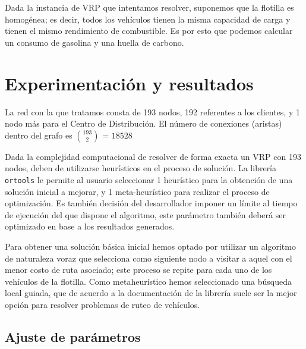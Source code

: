 \documentclass[journal]{IEEEtran}
\begin{document}
            Dada la instancia de VRP que intentamos resolver, suponemos que la flotilla es homogénea; es decir, todos los vehículos tienen la misma capacidad de carga y tienen el mismo rendimiento de combustible. Es por esto que podemos calcular un consumo de gasolina y una huella de carbono.
            
    \section{Experimentación y resultados} \label{sec:experimentation}
    
        La red con la que tratamos consta de 193 nodos, 192 referentes a los clientes, y 1 nodo más para el Centro de Distribución. El número de conexiones (aristas) dentro del grafo es $193\choose2$ = $18528$
        
        Dada la complejidad computacional de resolver de forma exacta un VRP con 193 nodos, deben de utilizarse heurísticos en el proceso de solución. La librería \texttt{ortools} \cite{ortools}le permite al usuario seleccionar 1 heurístico para la obtención de una solución inicial a mejorar, y 1 meta-heurístico para realizar el proceso de optimización. Es también decisión del desarrollador imponer un límite al tiempo de ejecución del que dispone el algoritmo, este parámetro también deberá ser optimizado en base a los resultados generados.

        Para obtener una solución básica inicial hemos optado por utilizar un algoritmo de naturaleza voraz que selecciona como siguiente nodo a visitar a aquel con el menor costo de ruta asociado; este proceso se repite para cada uno de los vehículos de la flotilla. Como metaheurístico hemos seleccionado una búsqueda local guiada, que de acuerdo a la documentación de la librería \cite{google-2021} suele ser la mejor opción para resolver problemas de ruteo de vehículos.

        \subsection{Ajuste de parámetros} \label{sec:parameter-tuning}
            
\end{document}
